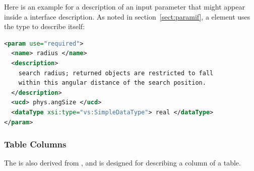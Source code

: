 \documentclass[11pt,a4paper]{ivoa}
\begin{document}


Here is an example for a description
of an input parameter that might appear inside a
 interface description.  As noted in
section~\ref{sect:paramif}, a 
element uses the  type to describe itself:

\begin{lstlisting}[language=XML]
<param use="required">
  <name> radius </name>
  <description>
    search radius; returned objects are restricted to fall
    within this angular distance of the search position.
  </description>
  <ucd> phys.angSize </ucd>
  <dataType xsi:type="vs:SimpleDataType"> real </dataType>
</param>
\end{lstlisting}

\subsubsection{Table Columns}
\label{sect:columns}


The  is also derived from
, and is designed for describing a column of
a table.
\end{document}
